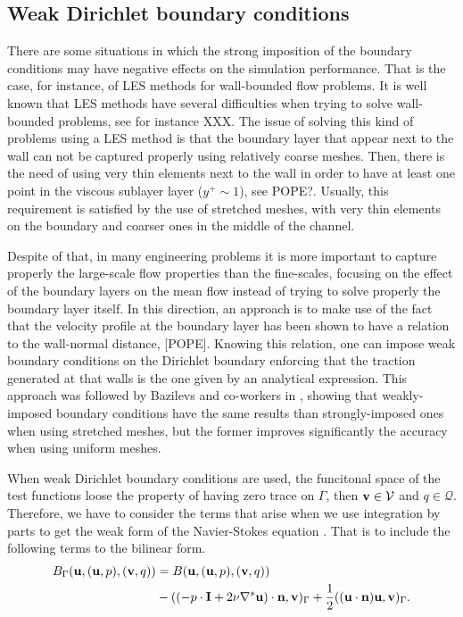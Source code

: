 \subsection{Weak Dirichlet boundary conditions}
\label{subsec-C7_weak_bcs}
There are some situations in which the strong imposition of the boundary conditions may have negative effects on the simulation performance. That is the case, for instance, of LES methods for wall-bounded flow problems. It is well known that LES methods have several difficulties when trying to solve wall-bounded problems, see for instance XXX. The issue of solving this kind of problems using a LES method is that the boundary layer that appear next to the wall can not be captured properly using relatively coarse meshes. Then, there is the need of using very thin elements next to the wall in order to have at least one point in the viscous sublayer layer ($ y^+\sim1 $), see POPE?. Usually, this requirement is satisfied by the use of stretched meshes, with very thin elements on the boundary and coarser ones in the middle of the channel.

Despite of that, in many engineering problems it is more important to capture properly the large-scale flow properties than the fine-scales, focusing on the effect of the boundary layers on the mean flow instead of trying to solve properly the boundary layer itself. In this direction, an approach is to make use of the fact that the velocity profile at the boundary layer has been shown to have a relation to the wall-normal distance, [POPE]. Knowing this relation, one can impose weak boundary conditions on the Dirichlet boundary enforcing that the traction generated at that walls is the one given by an analytical expression. This approach was followed by Bazilevs and co-workers in \cite{bazilevs}, showing that weakly-imposed boundary conditions have the same results than strongly-imposed ones when using stretched meshes, but the former improves significantly the accuracy when using uniform meshes. 

When weak Dirichlet boundary conditions are used, the funcitonal space of the test functions loose the property of having zero trace on $\Gamma$, then ${\bf v}\in\mathcal{V}$ and $q\in\mathcal{Q}$. Therefore, we have to consider the terms that arise when we use integration by parts to get the weak form of the Navier-Stokes equation . That is to include the following terms to the bilinear form.
\begin{align}
\label{eq-C7_bilinear_boundary}
B_\Gamma({\bf u},({\bf u},p),({\bf v},q))&=B({\bf u},({\bf u},p),({\bf v},q))\\\nonumber
&-((-p\cdot\mathbf{I}+2\nu\nabla^s{\bf u})\cdot{\bf n},{\bf v})_\Gamma+\frac{1}{2}(({\bf u}\cdot{\bf n}){\bf u},{\bf v})_\Gamma.
\end{align}

